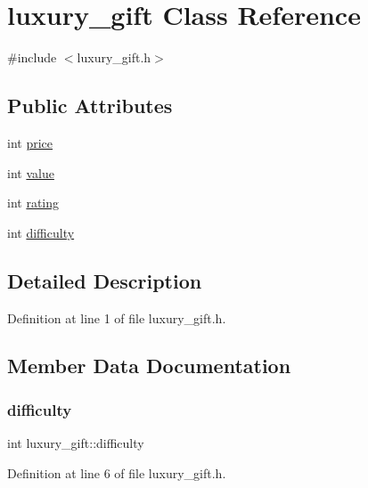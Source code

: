 \hypertarget{classluxury__gift}{}\section{luxury\+\_\+gift Class Reference}
\label{classluxury__gift}


{\ttfamily \#include $<$luxury\+\_\+gift.\+h$>$}

\subsection*{Public Attributes}
\begin{DoxyCompactItemize}
\item 
int \hyperlink{classluxury__gift_ae805c38f43df8abd9a5b3b4b3e0c76c3}{price}
\item 
int \hyperlink{classluxury__gift_a74ba47e7c250cec99e79632f0cf1fc0d}{value}
\item 
int \hyperlink{classluxury__gift_a80ff7535ef8d5d3a83bcd9235982dc7a}{rating}
\item 
int \hyperlink{classluxury__gift_a5008519d98d40a858ca913b81d7b2319}{difficulty}
\end{DoxyCompactItemize}


\subsection{Detailed Description}


Definition at line 1 of file luxury\+\_\+gift.\+h.



\subsection{Member Data Documentation}
\mbox{\label{classluxury__gift_a5008519d98d40a858ca913b81d7b2319}} 
\subsubsection{\texorpdfstring{difficulty}{difficulty}}
{\footnotesize\ttfamily int luxury\+\_\+gift\+::difficulty}



Definition at line 6 of file luxury\+\_\+gift.\+h.

\mbox{\label{classluxury__gift_ae805c38f43df8abd9a5b3b4b3e0c76c3}} 
